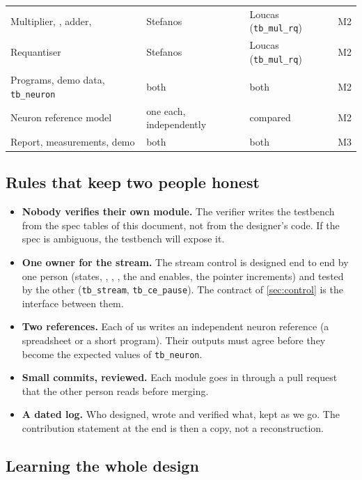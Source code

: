\begin{center}
\begin{tabularx}{\linewidth}{@{}L l l l@{}}
Multiplier, , adder,  & Stefanos & Loucas (\texttt{tb\_mul\_rq}) & M2 \\
Requantiser & Stefanos & Loucas (\texttt{tb\_mul\_rq}) & M2 \\
\addlinespace
{} \\
Programs, demo data, \texttt{tb\_neuron} & both & both & M2 \\
Neuron reference model & one each, independently & compared & M2 \\
Report, measurements, demo & both & both & M3 \\
\bottomrule
\end{tabularx}
\end{center}

\subsection{Rules that keep two people honest}

\begin{itemize}
\item \textbf{Nobody verifies their own module.} The verifier writes the testbench from the spec tables of this document, not from the designer's code. If the spec is ambiguous, the testbench will expose it.
\item \textbf{One owner for the stream.} The stream control is designed end to end by one person (states, , , , the  and  enables, the pointer increments) and tested by the other (\texttt{tb\_stream}, \texttt{tb\_ce\_pause}). The contract of \cref{sec:control} is the interface between them.
\item \textbf{Two references.} Each of us writes an independent neuron reference (a spreadsheet or a short program). Their outputs must agree before they become the expected values of \texttt{tb\_neuron}.
\item \textbf{Small commits, reviewed.} Each module goes in through a pull request that the other person reads before merging.
\item \textbf{A dated log.} Who designed, wrote and verified what, kept as we go. The contribution statement at the end is then a copy, not a reconstruction.
\end{itemize}

\subsection{Learning the whole design}

